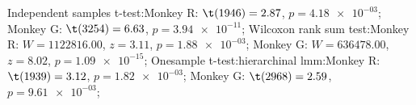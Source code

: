 Independent samples t-test:Monkey R: $\t(1946) = 2.87$, $p = \num{4.18e-03}$; 
Monkey G: $\t(3254) = 6.63$, $p = \num{3.94e-11}$; 
Wilcoxon rank sum test:Monkey R: $W = 1122816.00$, $z = 3.11$, $p = \num{1.88e-03}$; 
Monkey G: $W = 636478.00$, $z = 8.02$, $p = \num{1.09e-15}$; 
Onesample t-test:hierarchinal lmm:Monkey R: $\t(1939) = 3.12$, $p = \num{1.82e-03}$; 
Monkey G: $\t(2968) = 2.59$, $p = \num{9.61e-03}$; 
